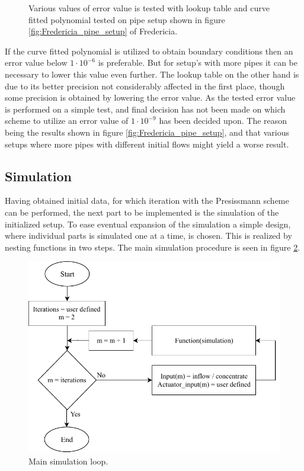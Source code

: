 \begin{figure}[H]
 \centering
 
\caption{Various values of error value is tested with lookup table and curve fitted polynomial tested on pipe setup shown in figure \ref{fig:Fredericia_pipe_setup} of Fredericia.}
\label{fig:error_value_test}
\end{figure} 

If the curve fitted polynomial is utilized to obtain boundary conditions then an error value below $1\cdot10^{-6}$ is preferable. But for setup's with more pipes it can be necessary to lower this value even further. The lookup table on the other hand is due to its better precision not considerably affected in the first place, though some precision is obtained by lowering the error value. As the tested error value is performed on a simple test, and final decision has not been made on which scheme to utilize an error value of $1\cdot10^{-9}$ has been decided upon. The reason being the results shown in figure \ref{fig:Fredericia_pipe_setup}, and that various setups where more pipes with different initial flows might yield a worse result.


\subsection*{Simulation}

Having obtained initial data, for which iteration with the Presissmann scheme can be performed, the next part to be implemented is the simulation of the initialized setup.
To ease eventual expansion of the simulation a simple design, where individual parts is simulated one at a time, is chosen. This is realized by nesting functions in two steps. The main simulation procedure is seen in figure \ref{fig:simu_main_chart}.

\begin{figure}[H]
\centering
\includegraphics[width=0.7 \textwidth]{report/simulation/pictures/simu_main_chart.pdf}
\caption{Main simulation loop.}
\label{fig:simu_main_chart}
\end{figure}

